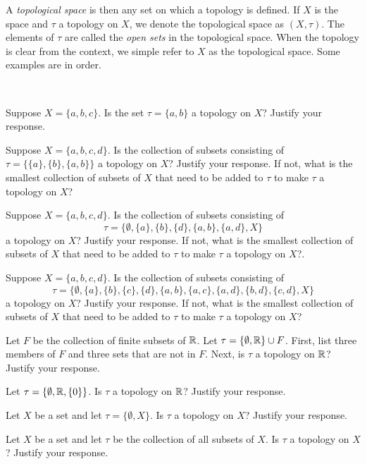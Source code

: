 A \emph{topological space} is then any set on which a topology is defined. If $X$ is the space and $\tau$ a topology on $X$, we denote the topological space as $(X, \tau)$. The elements of $\tau$ are called the \emph{open sets} in the topological space. When the topology is clear from the context, we simple refer to $X$ as the topological space. Some examples are in order. 

\begin{pa} ~
\be
\item Suppose $X  = \{ a, b, c\}$. Is the set $\tau = \{a,b\}$ a topology on $X$? Justify your response. 

\item Suppose $X= \{a,b,c,d\}$. Is the collection of subsets consisting of $\tau = \{ \{a\}, \{b\}, \{a,b\} \}$ a topology on $X$? Justify your response. If not, what is the smallest collection of subsets of $X$ that need to be added to $\tau$ to make $\tau$ a topology on $X$? 

\item Suppose $X= \{a,b,c,d\}$. Is the collection of subsets consisting of 
\[\tau = \{\emptyset, \{a\}, \{b\}, \{d\}, \{a,b\}, \{a,d\}, X \}\]
a topology on $X$? Justify your response. If not, what is the smallest collection of subsets of $X$ that need to be added to $\tau$ to make $\tau$ a topology on $X$?.

\item Suppose $X= \{a,b,c,d\}$. Is the collection of subsets consisting of 
\[\tau = \{\emptyset, \{a\}, \{b\}, \{c\}, \{d\}, \{a,b\}, \{a,c\}, \{a,d\}, \{b, d\}, \{c,d\}, X \}\]
a topology on $X$? Justify your response. If not, what is the smallest collection of subsets of $X$ that need to be added to $\tau$ to make $\tau$ a topology on $X$?

\item  Let $F$ be the collection of finite subsets of $\mathbb{R}$.  Let $\tau = \{\emptyset, \mathbb{R}\} \cup F$. First, list three members of $F$ and three sets that are not in $F$. Next, is $\tau$ a topology on $\mathbb{R}$? Justify your response.

\item Let $\tau = \{\emptyset, \mathbb{R}, \{0\} \}$. Is $\tau$ a topology on $\mathbb{R}$? Justify your response.

\item Let $X$ be a set and let $\tau = \{\emptyset, X\}$. Is $\tau$ a topology on $X$? Justify your response.

\item Let $X$ be a set and let $\tau$ be the collection of all subsets of $X$. Is $\tau$ a topology on $X$? Justify your response.

\ee

\end{pa}

